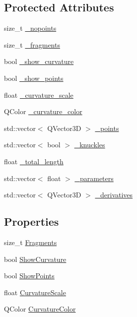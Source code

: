 \subsection*{Protected Attributes}
\begin{DoxyCompactItemize}
\item 
size\-\_\-t \hyperlink{classShipCADGeometry_1_1Spline_a0d0c8014132eda7835842d6a20ccdf74}{\-\_\-nopoints}
\item 
size\-\_\-t \hyperlink{classShipCADGeometry_1_1Spline_afc73aefcc80c61121888a63abf687b40}{\-\_\-fragments}
\item 
bool \hyperlink{classShipCADGeometry_1_1Spline_aa3640f8d0561a651aec79a5d80c871f3}{\-\_\-show\-\_\-curvature}
\item 
bool \hyperlink{classShipCADGeometry_1_1Spline_a64b335f1c21a26f5f01ddcfbf92501d6}{\-\_\-show\-\_\-points}
\item 
float \hyperlink{classShipCADGeometry_1_1Spline_a775e87cfe42d7f2eb747b1ab3e772b88}{\-\_\-curvature\-\_\-scale}
\item 
Q\-Color \hyperlink{classShipCADGeometry_1_1Spline_a2c51c87d9f9caedf39f887029f040a36}{\-\_\-curvature\-\_\-color}
\item 
std\-::vector$<$ Q\-Vector3\-D $>$ \hyperlink{classShipCADGeometry_1_1Spline_ab6db595e6a4dd703838d5baec8543f34}{\-\_\-points}
\item 
std\-::vector$<$ bool $>$ \hyperlink{classShipCADGeometry_1_1Spline_a5bfae9fec6fa04634083bb7fa6ac9452}{\-\_\-knuckles}
\item 
float \hyperlink{classShipCADGeometry_1_1Spline_a4f4832362958e63f9b9503414466a2ae}{\-\_\-total\-\_\-length}
\item 
std\-::vector$<$ float $>$ \hyperlink{classShipCADGeometry_1_1Spline_a48f36b8eb159586aa334877f4ab7a015}{\-\_\-parameters}
\item 
std\-::vector$<$ Q\-Vector3\-D $>$ \hyperlink{classShipCADGeometry_1_1Spline_a57c78404d9c30c448d9f5ac377fc0e8f}{\-\_\-derivatives}
\end{DoxyCompactItemize}
\subsection*{Properties}
\begin{DoxyCompactItemize}
\item 
size\-\_\-t \hyperlink{classShipCADGeometry_1_1Spline_a964d9e0dcb98962d920dd5e595598a42}{Fragments}
\item 
bool \hyperlink{classShipCADGeometry_1_1Spline_ad4357d84fc550cf73581a303f7bd9088}{Show\-Curvature}
\item 
bool \hyperlink{classShipCADGeometry_1_1Spline_a7e14387674284ab28e1a0e725c5c5b0e}{Show\-Points}
\item 
float \hyperlink{classShipCADGeometry_1_1Spline_a2f9eb570f1bfe818d966a40cd0733df2}{Curvature\-Scale}
\item 
Q\-Color \hyperlink{classShipCADGeometry_1_1Spline_a4bc6d35c4d11b8df95e69300ef7120c7}{Curvature\-Color}
\end{DoxyCompactItemize}


